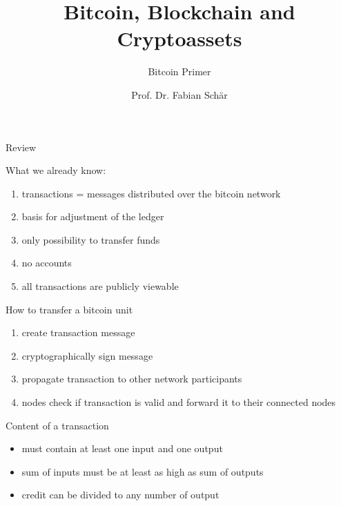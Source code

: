 \documentclass[]{beamer}
\title{Bitcoin, Blockchain and Cryptoassets}
\subtitle{Bitcoin Primer}
\author{Prof. Dr. Fabian Schär}
\institute{University of Basel}
\begin{document}
\thispagestyle{empty}
\begin{frame}[noframenumbering]
	\titlepage
\end{frame}


\begin{frame}{Review}

What we already know: \\ 
\vspace{1em}
	\begin{enumerate}
		\item<1->{transactions = messages distributed over the bitcoin network}
		\item<2->{basis for adjustment of the ledger}
		\item<3->{only possibility to transfer funds}
		\item<4->{no accounts}
		\item<5->{all transactions are publicly viewable}
	\end{enumerate}
\end{frame}


\begin{frame}{How to transfer a bitcoin unit} %

\begin{enumerate}
		\item<1->{create transaction message}
		\item<2->{cryptographically sign message}
		\item<3->{propagate transaction to other network participants}
		\item<4->{nodes check if transaction is valid and forward it to their connected nodes}
	\end{enumerate}	
\end{frame}


\begin{frame}{Content of a transaction} %

\vspace{1em}
\begin{itemize}
  \item<2->{must contain at least one input and one output}
  \item<3->{sum of inputs must be at least as high as sum of outputs}
	\item<4->{credit can be divided to any number of output}
\end{itemize}
\end{frame}	
\end{document}
